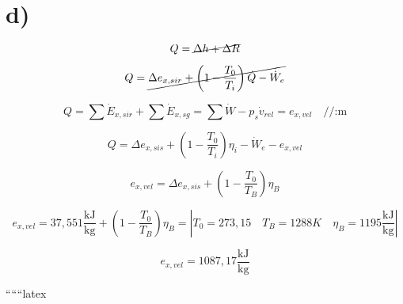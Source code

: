 

\section*{d)}

\[
Q = \cancel{\Delta h + \Delta R}
\]

\[
Q = \cancel{\Delta e_{x,sir} + \left( 1 - \frac{T_0}{T_i} \right) \dot{Q} - \dot{W}_e}
\]

\[
Q = \sum \dot{E}_{x,sir} + \sum \dot{E}_{x,sg} = \sum \dot{W} - p_s \dot{v}_{rel} = e_{x,vel} \quad \text{//:m}
\]

\[
Q = \Delta e_{x,sis} + \left( 1 - \frac{T_0}{T_i} \right) \eta_i - \dot{W}_e - e_{x,vel}
\]

\[
e_{x,vel} = \Delta e_{x,sis} + \left( 1 - \frac{T_0}{T_B} \right) \eta_B
\]

\[
e_{x,vel} = 37,551 \frac{\text{kJ}}{\text{kg}} + \left( 1 - \frac{T_0}{T_B} \right) \eta_B = \left| T_0 = 273,15 \quad T_B = 1288 K \quad \eta_B = 1195 \frac{\text{kJ}}{\text{kg}} \right|
\]

\[
e_{x,vel} = 1087,17 \frac{\text{kJ}}{\text{kg}}
\]

``````latex